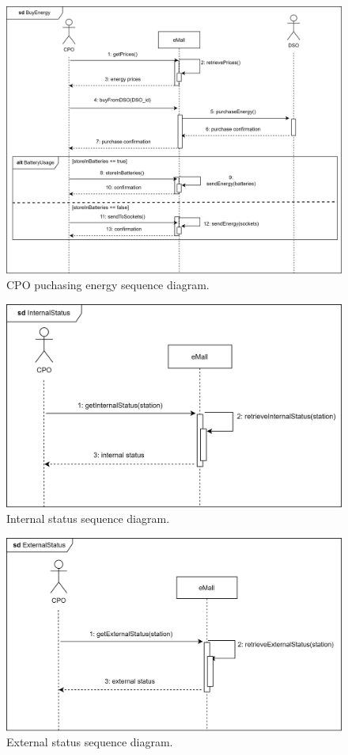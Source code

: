 \begin{figure}[H]
    \centering
    \includegraphics[width=\textwidth]{images/sd_buy.png}
    \caption{CPO puchasing energy sequence diagram.}
    \label{fig:sd_cpo_purchasing_energy}
\end{figure}
\begin{figure}[H]
    \centering
    \includegraphics[width=\textwidth]{images/sd_internal.png}
    \caption{Internal status sequence diagram.}
    \label{fig:sd_internal_status}
\end{figure}
\begin{figure}[H]
    \centering
    \includegraphics[width=\textwidth]{images/sd_external.png}
    \caption{External status sequence diagram.}
    \label{fig:sd_external_status}
\end{figure}
